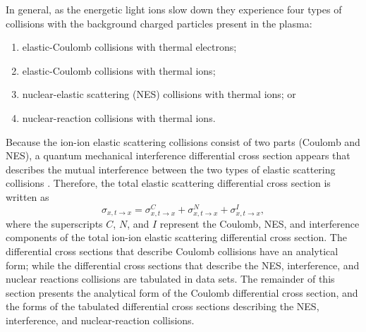 \documentclass[../main.tex]{subfiles}
\begin{document}
In general, as the energetic light ions slow down they experience four types of collisions with the background charged particles present in the plasma:
\begin{enumerate}
    \item elastic-Coulomb collisions with thermal electrons;
    \item elastic-Coulomb collisions with thermal ions;
    \item nuclear-elastic scattering (NES) collisions with thermal ions; or
    \item nuclear-reaction collisions with thermal ions.
\end{enumerate}
Because the ion-ion elastic scattering collisions consist of two parts (Coulomb and NES), a quantum mechanical interference differential cross section appears that describes the mutual interference between the two types of elastic scattering collisions \cite{Devaney-1971}. Therefore, the total elastic scattering differential cross section is written as
\begin{equation}
    \sigma_{x,t \rightarrow x} = \sigma_{x,t \rightarrow x}^C + \sigma_{x,t \rightarrow x}^N + \sigma_{x,t \rightarrow x}^I,
\end{equation}
where the superscripts $C$, $N$, and $I$ represent the Coulomb, NES, and interference components of the total ion-ion elastic scattering differential cross section. The differential cross sections that describe Coulomb collisions have an analytical form; while the differential cross sections that describe the NES, interference, and nuclear reactions collisions are tabulated in data sets. The remainder of this section presents the analytical form of the Coulomb differential cross section, and the forms of the tabulated differential cross sections describing the NES, interference, and nuclear-reaction collisions.

\end{document}
